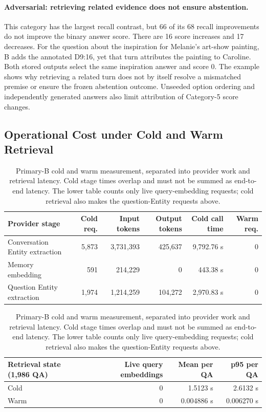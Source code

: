 \documentclass[a4paper,twoside]{article}
\begin{document}
\paragraph{Adversarial: retrieving related evidence does not ensure abstention.}
This category has the largest recall contrast, but 66 of its 68 recall
improvements do not improve the binary answer score. There are 16 score
increases and 17 decreases. For the question about the inspiration for
Melanie's art-show painting, B adds the annotated D9:16, yet that turn
attributes the painting to Caroline. Both stored outputs select the same
inspiration answer and score 0. The example shows why retrieving a related
turn does not by itself resolve a mismatched premise or ensure the frozen
abstention outcome. Unseeded option ordering and independently generated
answers also limit attribution of Category-5 score changes.

\subsection{Operational Cost under Cold and Warm Retrieval}

\begin{table}[t]
\centering
\caption{Primary-B cold and warm measurement, separated into provider work
and retrieval latency. Cold stage times overlap and must not be summed as
end-to-end latency. The lower table counts only live query-embedding
requests; cold retrieval also makes the question-Entity requests above.}
\label{tab:cost}
\begin{tabular}{@{}lrrrrr@{}}
\toprule
Provider stage & Cold req. & Input tokens & Output tokens & Cold call time & Warm req. \\
\midrule
Conversation Entity extraction & 5,873 & 3,731,393 & 425,637 & 9,792.76 s & 0 \\
Memory embedding & 591 & 214,229 & 0 & 443.38 s & 0 \\
Question Entity extraction & 1,974 & 1,214,259 & 104,272 & 2,970.83 s & 0 \\
\bottomrule
\end{tabular}

\vspace{0.45em}
\begin{tabular}{@{}lrrr@{}}
\toprule
Retrieval state (1,986 QA) & Live query embeddings & Mean per QA & p95 per QA \\
\midrule
Cold & 0 & 1.5123 s & 2.6132 s \\
Warm & 0 & 0.004886 s & 0.006270 s \\
\bottomrule
\end{tabular}
\end{table}
\end{document}
